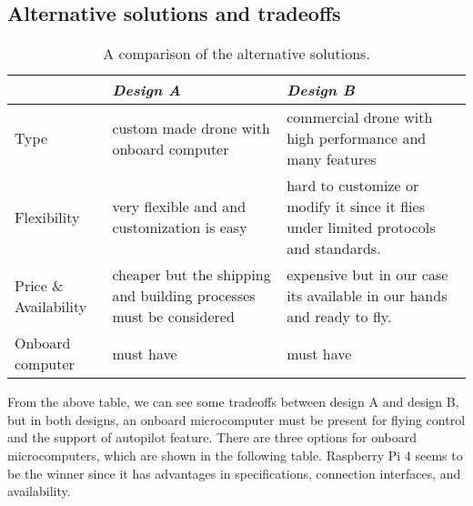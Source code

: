 \documentclass[../main.tex]{subfiles}
\begin{document}
\subsection{Alternative solutions and tradeoffs}
\begin{table}[H]
    \centering
    \caption{A comparison of the alternative solutions.}
    \label{tab:alt-solutions}
    \begin{tabular}{ p{4cm} p{6cm} p{6cm} }
        \toprule
        \textit{} & \textit{Design A} & \textit{Design B}\\ \midrule
        Type  & custom made drone with onboard computer & commercial drone with high performance and many features    \\
        Flexibility & very flexible and and customization is easy & hard to customize or modify it since it flies under limited protocols and standards. \\

        Price \& Availability & cheaper but the shipping and building processes must be considered & expensive but in our case its available in our hands and ready to fly.   \\

        Onboard computer & must have & must have \\
        \bottomrule
    \end{tabular}
\end{table} 
From the above table, we can see some tradeoffs between design A and design B, but in both designs, an onboard microcomputer must be present for flying control and the support of autopilot feature. There are three options for onboard microcomputers, which are shown in the following table. Raspberry Pi 4 seems to be the winner since it has advantages in specifications, connection interfaces, and availability.
\end{document}
